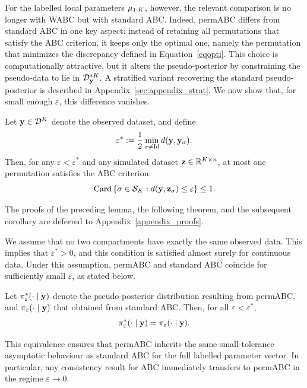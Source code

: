 For the labelled local parameters \(\mu_{1:K}\), however, the relevant comparison is no longer with WABC but with standard ABC. Indeed, permABC differs from standard ABC in one key aspect: instead of retaining all permutations that satisfy the ABC criterion, it keeps only the optimal one, namely the permutation that minimizes the discrepancy defined in Equation~\eqref{eqopti}. This choice is computationally attractive, but it alters the pseudo-posterior by constraining the pseudo-data to lie in \(\mathcal{D}^{*K}_{\mathbf{y}}\). A stratified variant recovering the standard pseudo-posterior is described in Appendix~\ref{sec:appendix_strat}. We now show that, for small enough \(\varepsilon\), this difference vanishes.

\begin{lemma}
\label{lempermABC_star}
Let \(\mathbf{y} \in \mathcal{D}^K\) denote the observed dataset, and define
\[
\varepsilon^* := \frac{1}{2}\min_{\sigma \neq \mathrm{Id}} d(\mathbf{y},\mathbf{y}_\sigma).
\]
Then, for any \(\varepsilon < \varepsilon^*\) and any simulated dataset \(\mathbf{z} \in \mathbb{R}^{K \times n}\), at most one permutation satisfies the ABC criterion:
\[
\mathrm{Card}\left\{\sigma \in \mathcal{S}_K : d(\mathbf{y},\mathbf{z}_\sigma)\le \varepsilon\right\}\le 1.
\]
\end{lemma}

The proofs of the preceding lemma, the following theorem, and the subsequent corollary are deferred to Appendix~\ref{appendix_proofs}.

We assume that no two compartments have exactly the same observed data. This implies that \(\varepsilon^*>0\), and this condition is satisfied almost surely for continuous data. Under this assumption, permABC and standard ABC coincide for sufficiently small \(\varepsilon\), as stated below.

\begin{theorem}
\label{th:permABC_star}
Let \(\pi^*_{\varepsilon}(\cdot\mid\mathbf{y})\) denote the pseudo-posterior distribution resulting from permABC, and \(\pi_{\varepsilon}(\cdot\mid\mathbf{y})\) that obtained from standard ABC. Then, for all \(\varepsilon<\varepsilon^*\),
\[
\pi^*_{\varepsilon}(\cdot\mid\mathbf{y})=\pi_{\varepsilon}(\cdot\mid\mathbf{y}).
\]
\end{theorem}

This equivalence ensures that permABC inherits the same small-tolerance asymptotic behaviour as standard ABC for the full labelled parameter vector. In particular, any consistency result for ABC immediately transfers to permABC in the regime \(\varepsilon\to0\).

